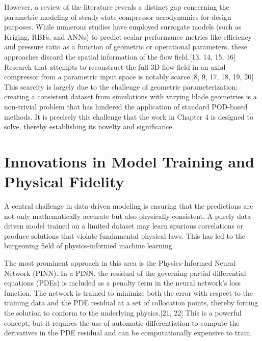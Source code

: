 \documentclass[12pt, a4paper]{report}
\begin{document}
However, a review of the literature reveals a distinct gap concerning the parametric modeling of steady-state compressor aerodynamics for design purposes. While numerous studies have employed surrogate models (such as Kriging, RBFs, and ANNs) to predict scalar performance metrics like efficiency and pressure ratio as a function of geometric or operational parameters, these approaches discard the spatial information of the flow field.[13, 14, 15, 16] Research that attempts to reconstruct the full 3D flow field in an axial compressor from a parametric input space is notably scarce.[8, 9, 17, 18, 19, 20] This scarcity is largely due to the challenge of geometric parameterization; creating a consistent dataset from simulations with varying blade geometries is a non-trivial problem that has hindered the application of standard POD-based methods. It is precisely this challenge that the work in Chapter 4 is designed to solve, thereby establishing its novelty and significance.

\section{Innovations in Model Training and Physical Fidelity}

A central challenge in data-driven modeling is ensuring that the predictions are not only mathematically accurate but also physically consistent. A purely data-driven model trained on a limited dataset may learn spurious correlations or produce solutions that violate fundamental physical laws. This has led to the burgeoning field of physics-informed machine learning.

The most prominent approach in this area is the Physics-Informed Neural Network (PINN). In a PINN, the residual of the governing partial differential equations (PDEs) is included as a penalty term in the neural network's loss function. The network is trained to minimize both the error with respect to the training data and the PDE residual at a set of collocation points, thereby forcing the solution to conform to the underlying physics.[21, 22] This is a powerful concept, but it requires the use of automatic differentiation to compute the derivatives in the PDE residual and can be computationally expensive to train.
\end{document}
